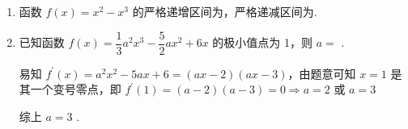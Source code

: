 \begin{enumerate}
\begin{jieda}
        当 ${x}_{2} = 1$ 时,此时 $k = {{e}}^{{x}_{2} - 2} = \dfrac{1}{{e}},b = \left( {1 - {x}_{2}}\right) {{e}}^{{x}_{2} - 2} = 0$ ,所以 $k + b = \dfrac{1}{{e}}$
        
        当 ${x}_{2} = 2$ 时,此时 $k = {{e}}^{{x}_{2} - 2} = 1,b = \left( {1 - {x}_{2}}\right) {{e}}^{{x}_{2} - 2} =  - 1$ ,所以 $k + b = 0$
        
        所以 $k + b = 0$ 或 $\dfrac{1}{{e}}$
    \end{jieda}

    \item 函数 $f\left( x\right)  = {x}^{2} - {x}^{3}$ 的严格递增区间为，严格递减区间为.
    
    \item 已知函数 $f\left( x\right)  = \dfrac{1}{3}{a}^{2}{x}^{3} - \dfrac{5}{2}a{x}^{2} + {6x}$ 的极小值点为 1，则 $a =$ .
    \begin{jieda}
        易知 ${f}^{\prime }\left( x\right)  = {a}^{2}{x}^{2} - {5ax} + 6 = \left( {{ax} - 2}\right) \left( {{ax} - 3}\right)$，由题意可知 $x = 1$ 是其一个变号零点，即 ${f}^{\prime }\left( 1\right)  = \left( {a - 2}\right) \left( {a - 3}\right)  = 0 \Longrightarrow  a = 2$ 或 $a = 3$
        综上 $a = 3$ .
    \end{jieda}
    

\end{enumerate}

